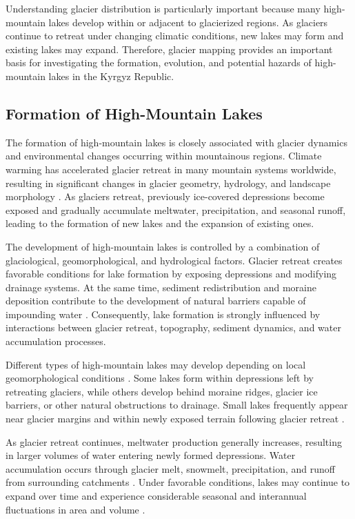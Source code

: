 \documentclass[12pt,a4paper]{report}
\begin{document}
Understanding glacier distribution is particularly important because many high-mountain lakes develop within or adjacent to glacierized regions. As glaciers continue to retreat under changing climatic conditions, new lakes may form and existing lakes may expand. Therefore, glacier mapping provides an important basis for investigating the formation, evolution, and potential hazards of high-mountain lakes in the Kyrgyz Republic.

\subsection{Formation of High-Mountain Lakes}

The formation of high-mountain lakes is closely associated with glacier dynamics and environmental changes occurring within mountainous regions. Climate warming has accelerated glacier retreat in many mountain systems worldwide, resulting in significant changes in glacier geometry, hydrology, and landscape morphology \cite{Aizen2006, Bolch2012}. As glaciers retreat, previously ice-covered depressions become exposed and gradually accumulate meltwater, precipitation, and seasonal runoff, leading to the formation of new lakes and the expansion of existing ones.

The development of high-mountain lakes is controlled by a combination of glaciological, geomorphological, and hydrological factors. Glacier retreat creates favorable conditions for lake formation by exposing depressions and modifying drainage systems. At the same time, sediment redistribution and moraine deposition contribute to the development of natural barriers capable of impounding water \cite{Cook2015, Carrivick2013}. Consequently, lake formation is strongly influenced by interactions between glacier retreat, topography, sediment dynamics, and water accumulation processes. 

Different types of high-mountain lakes may develop depending on local geomorphological conditions \cite{Mergili2011}. Some lakes form within depressions left by retreating glaciers, while others develop behind moraine ridges, glacier ice barriers, or other natural obstructions to drainage. Small lakes frequently appear near glacier margins and within newly exposed terrain following glacier retreat \cite{Worni2013}. 

As glacier retreat continues, meltwater production generally increases, resulting in larger volumes of water entering newly formed depressions. Water accumulation occurs through glacier melt, snowmelt, precipitation, and runoff from surrounding catchments \cite{Carrivick2013}. Under favorable conditions, lakes may continue to expand over time and experience considerable seasonal and interannual fluctuations in area and volume \cite{Veh2020}. 
\end{document}
